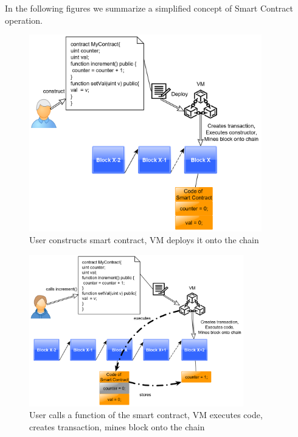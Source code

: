 \documentclass[a4paper]{article}
\begin{document}


In the following figures we summarize a simplified concept of Smart Contract operation.

\begin{figure}[H]
    \centering
    \includegraphics[width=0.9\textwidth]{figures/deploy_0.png}
    \caption{User constructs smart contract, VM deploys it onto the chain}
    \label{fig:deploy_0}
\end{figure}
\begin{figure}[H]
    \centering
    \includegraphics[width=0.83\textwidth]{figures/deploy_1.png}
    \caption{User calls a function of the smart contract, VM executes code, creates transaction, mines block onto the chain}
    \label{fig:deploy_1}
\end{figure}
\end{document}
